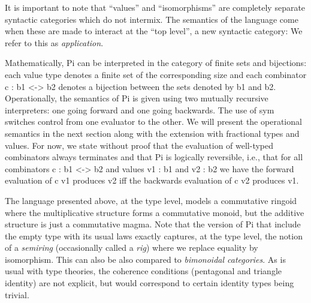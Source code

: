 \documentclass{llncs}
\newcommand{\jacques}[1]{\textsc{Jacques says:} #1}
\begin{document}
It is important to note that ``values'' and ``isomorphisms'' are 
completely separate syntactic categories which do not intermix.  The 
semantics of the language come when these are made to interact at
the ``top level'', a new syntactic category:
\noindent We refer to this as \emph{application}.



Mathematically, {{Pi}} can be interpreted in the category of finite sets and
bijections: each value type denotes a finite set of the corresponding size
and each combinator {{c : b1 <-> b2}} denotes a bijection between the sets
denoted by {{b1}} and {{b2}}. Operationally, the semantics of {{Pi}} is given
using two mutually recursive interpreters: one going forward and one going
backwards. The use of {{sym}} switches control from one evaluator to the
other. We will present the operational semantics in the next section along
with the extension with fractional types and values. For now, we state
without proof that the evaluation of well-typed combinators always terminates
and that {{Pi}} is logically reversible, i.e., that for all combinators 
{{c : b1 <-> b2}} and values {{v1 : b1}} and {{v2 : b2}} we have the forward
evaluation of {{c v1}} produces {{v2}} iff the backwards evaluation of 
{{c v2}} produces {{v1}}. 


The language presented above, at the type level, models a commutative ringoid
where the multiplicative structure forms a commutative monoid, but the
additive structure is just a commutative magma.  Note that the version of
{{Pi}} that include the empty type with its usual laws exactly captures, at
the type level, the notion of a \emph{semiring} (occasionally called a
\emph{rig}) where we replace equality by isomorphism.  This can also be also
compared to \emph{bimonoidal categories}.  As is usual with type theories,
the coherence conditions (pentagonal and triangle identity) are not explicit,
but would correspond to certain identity types being trivial.
\end{document}
